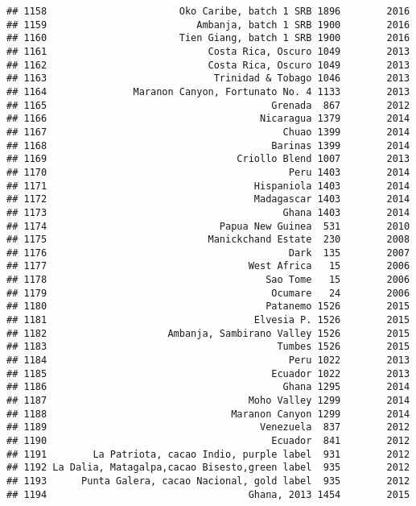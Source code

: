 \documentclass[
]{article}
\begin{document}
\begin{verbatim}
## 1158                       Oko Caribe, batch 1 SRB 1896        2016
## 1159                          Ambanja, batch 1 SRB 1900        2016
## 1160                       Tien Giang, batch 1 SRB 1900        2016
## 1161                            Costa Rica, Oscuro 1049        2013
## 1162                            Costa Rica, Oscuro 1049        2013
## 1163                             Trinidad & Tobago 1046        2013
## 1164               Maranon Canyon, Fortunato No. 4 1133        2013
## 1165                                       Grenada  867        2012
## 1166                                     Nicaragua 1379        2014
## 1167                                         Chuao 1399        2014
## 1168                                       Barinas 1399        2014
## 1169                                 Criollo Blend 1007        2013
## 1170                                          Peru 1403        2014
## 1171                                    Hispaniola 1403        2014
## 1172                                    Madagascar 1403        2014
## 1173                                         Ghana 1403        2014
## 1174                              Papua New Guinea  531        2010
## 1175                            Manickchand Estate  230        2008
## 1176                                          Dark  135        2007
## 1177                                   West Africa   15        2006
## 1178                                      Sao Tome   15        2006
## 1179                                       Ocumare   24        2006
## 1180                                      Patanemo 1526        2015
## 1181                                    Elvesia P. 1526        2015
## 1182                     Ambanja, Sambirano Valley 1526        2015
## 1183                                        Tumbes 1526        2015
## 1184                                          Peru 1022        2013
## 1185                                       Ecuador 1022        2013
## 1186                                         Ghana 1295        2014
## 1187                                   Moho Valley 1299        2014
## 1188                                Maranon Canyon 1299        2014
## 1189                                     Venezuela  837        2012
## 1190                                       Ecuador  841        2012
## 1191        La Patriota, cacao Indio, purple label  931        2012
## 1192 La Dalia, Matagalpa,cacao Bisesto,green label  935        2012
## 1193      Punta Galera, cacao Nacional, gold label  935        2012
## 1194                                   Ghana, 2013 1454        2015

\end{verbatim}
\end{document}
